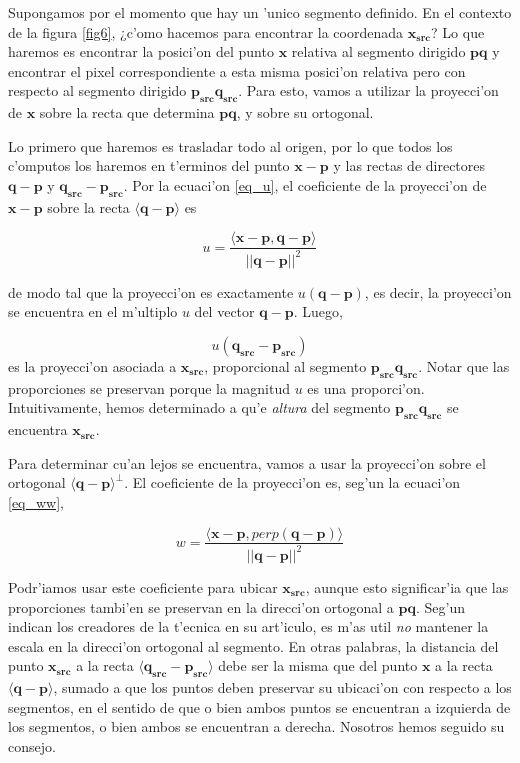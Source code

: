 Supongamos por el momento que hay un 'unico segmento definido. En el contexto de la figura \ref{fig6}, ¿c'omo hacemos para encontrar la coordenada $\mathbf{x_{src}}$? Lo que haremos es encontrar la posici'on del punto $\mathbf{x}$ relativa al segmento dirigido $\mathbf{pq}$ y encontrar el pixel correspondiente a esta misma posici'on relativa pero con respecto al segmento dirigido $\mathbf{p_{src}q_{src}}$. Para esto, vamos a utilizar la proyecci'on de $\mathbf{x}$ sobre la recta que determina $\mathbf{pq}$, y sobre su ortogonal.

Lo primero que haremos es trasladar todo al origen, por lo que todos los c'omputos los haremos en t'erminos del punto $\mathbf{x} - \mathbf{p}$ y las rectas de directores $\mathbf{q} - \mathbf{p}$ y $\mathbf{q_{src}} - \mathbf{p_{src}}$. Por la ecuaci'on \ref{eq_u}, el coeficiente de la proyecci'on de $\mathbf{x} - \mathbf{p}$ sobre la recta $\langle \mathbf{q} - \mathbf{p} \rangle$ es

\begin{equation}
u = \frac{\langle \mathbf{x} - \mathbf{p}, \mathbf{q} - \mathbf{p} \rangle}{||\mathbf{q} - \textbf{p}||^2}
\label{eq_u_posta}
\end{equation}

\noindent
de modo tal que la proyecci'on es exactamente $u (\mathbf{q} - \mathbf{p})$, es decir, la proyecci'on se encuentra en el m'ultiplo $u$ del vector $\mathbf{q} - \mathbf{p}$. Luego,

\begin{equation}
u (\mathbf{q_{src}} - \mathbf{p_{src}})
\label{eq_qp}
\end{equation}
es la proyecci'on asociada a $\mathbf{x_{src}}$, proporcional al segmento $\mathbf{p_{src}q_{src}}$. Notar que las proporciones se preservan porque la magnitud $u$ es una proporci'on. Intuitivamente, hemos determinado a qu'e \textit{altura} del segmento $\mathbf{p_{src}q_{src}}$ se encuentra $\mathbf{x_{src}}$.

Para determinar cu'an lejos se encuentra, vamos a usar la proyecci'on sobre el ortogonal $\langle \mathbf{q} - \mathbf{p} \rangle^{\perp}$. El coeficiente de la proyecci'on es, seg'un la ecuaci'on \ref{eq_ww},

\[w = \frac{\langle \mathbf{x} - \mathbf{p}, perp(\mathbf{q} - \mathbf{p}) \rangle}{||\mathbf{q} - \mathbf{p}||^2}\]

Podr'iamos usar este coeficiente para ubicar $\mathbf{x_{src}}$, aunque esto significar'ia que las proporciones tambi'en se preservan en la direcci'on ortogonal a $\mathbf{pq}$. Seg'un indican los creadores de la t'ecnica en su art'iculo, es m'as util \emph{no} mantener la escala en la direcci'on ortogonal al segmento. En otras palabras, la distancia del punto $\mathbf{x_{src}}$ a la recta $\langle \mathbf{q_{src}} - \mathbf{p_{src}} \rangle$ debe ser la misma que del punto $\mathbf{x}$ a la recta $\langle \mathbf{q} - \mathbf{p} \rangle$, sumado a que los puntos deben preservar su ubicaci'on con respecto a los segmentos, en el sentido de que o bien ambos puntos se encuentran a izquierda de los segmentos, o bien ambos se encuentran a derecha. Nosotros hemos seguido su consejo.

